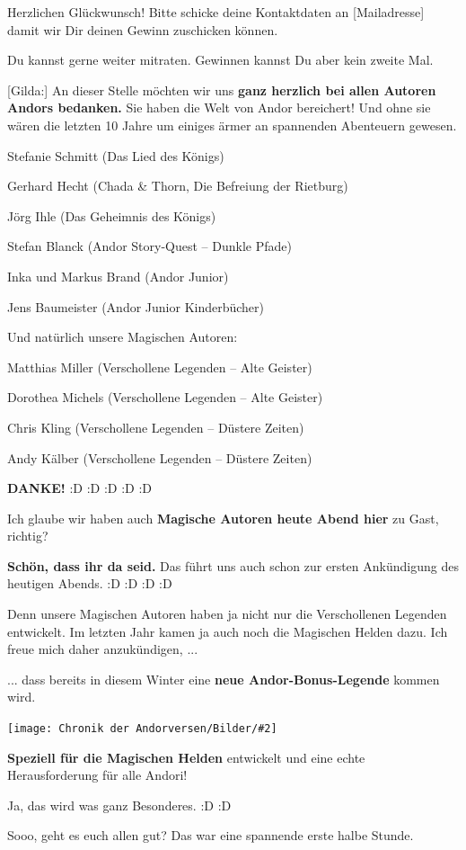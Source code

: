 \documentclass[10pt, a4paper, oneside]{book}
\newcommand{\bildmitts}[2][height=0.32\textwidth,width=0.48\textwidth,keepaspectratio]{%
    \begin{center}
        \texttt{[image: Chronik der Andorversen/Bilder/\#2]}
    \end{center}
}
\begin{document}
\begin{multicols}{2}
Herzlichen Glückwunsch! Bitte schicke deine Kontaktdaten an [Mailadresse] damit wir Dir deinen Gewinn zuschicken können.

Du kannst gerne weiter mitraten. Gewinnen kannst Du aber kein zweite Mal.

[Gilda:] An dieser Stelle möchten wir uns \textbf{ganz herzlich bei allen Autoren Andors bedanken.} Sie haben die Welt von Andor bereichert! Und ohne sie wären die letzten 10 Jahre um einiges ärmer an spannenden Abenteuern gewesen.

Stefanie Schmitt (Das Lied des Königs)

Gerhard Hecht (Chada \& Thorn, Die Befreiung der Rietburg)

Jörg Ihle (Das Geheimnis des Königs)

Stefan Blanck (Andor Story-Quest – Dunkle Pfade)

Inka und Markus Brand (Andor Junior)

Jens Baumeister (Andor Junior Kinderbücher)

Und natürlich unsere Magischen Autoren:

Matthias Miller (Verschollene Legenden – Alte Geister)

Dorothea Michels (Verschollene Legenden – Alte Geister)

Chris Kling (Verschollene Legenden – Düstere Zeiten)

Andy Kälber (Verschollene Legenden – Düstere Zeiten)

\textbf{DANKE!} :D :D :D :D :D

Ich glaube wir haben auch \textbf{Magische Autoren heute Abend hier} zu Gast, richtig?

\textbf{Schön, dass ihr da seid.} Das führt uns auch schon zur ersten Ankündigung des heutigen Abends. :D :D :D :D

Denn unsere Magischen Autoren haben ja nicht nur die Verschollenen Legenden entwickelt. Im letzten Jahr kamen ja auch noch die Magischen Helden dazu. Ich freue mich daher anzukündigen, ...

... dass bereits in diesem Winter eine \textbf{neue Andor-Bonus-Legende} kommen wird.

\bildmitts{AA2022 Tavernen-Party 4.jpeg}

\textbf{Speziell für die Magischen Helden} entwickelt und eine echte Herausforderung für alle Andori!

Ja, das wird was ganz Besonderes. :D :D

Sooo, geht es euch allen gut? Das war eine spannende erste halbe Stunde.


\end{multicols}
\end{document}
